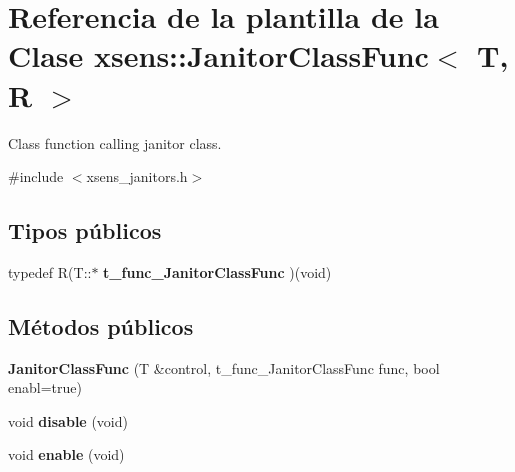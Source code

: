 \hypertarget{classxsens_1_1JanitorClassFunc}{\section{\-Referencia de la plantilla de la \-Clase xsens\-:\-:\-Janitor\-Class\-Func$<$ \-T, \-R $>$}
\label{classxsens_1_1JanitorClassFunc}
}


\-Class function calling janitor class.  




{\ttfamily \#include $<$xsens\-\_\-janitors.\-h$>$}

\subsection*{\-Tipos públicos}
\begin{DoxyCompactItemize}
\item 
\hypertarget{classxsens_1_1JanitorClassFunc_a30ea6469d27a1ddb625731411dcf4a50}{typedef \-R(\-T\-::$\ast$ {\bfseries t\-\_\-func\-\_\-\-Janitor\-Class\-Func} )(void)}\label{classxsens_1_1JanitorClassFunc_a30ea6469d27a1ddb625731411dcf4a50}

\end{DoxyCompactItemize}
\subsection*{\-Métodos públicos}
\begin{DoxyCompactItemize}
\item 
\hypertarget{classxsens_1_1JanitorClassFunc_a74fa44d8acaa46c40cb5199018e535b6}{{\bfseries \-Janitor\-Class\-Func} (\-T \&control, t\-\_\-func\-\_\-\-Janitor\-Class\-Func func, bool enabl=true)}\label{classxsens_1_1JanitorClassFunc_a74fa44d8acaa46c40cb5199018e535b6}

\item 
\hypertarget{classxsens_1_1JanitorClassFunc_afd298897c201b68ee16fb2e0c36e18fd}{void {\bfseries disable} (void)}\label{classxsens_1_1JanitorClassFunc_afd298897c201b68ee16fb2e0c36e18fd}

\item 
\hypertarget{classxsens_1_1JanitorClassFunc_a1c815a44b79ade44d47bf96325eb4203}{void {\bfseries enable} (void)}\label{classxsens_1_1JanitorClassFunc_a1c815a44b79ade44d47bf96325eb4203}

\end{DoxyCompactItemize}


